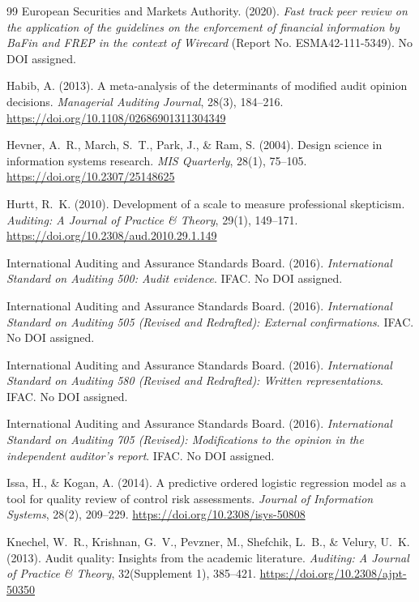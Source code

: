 \documentclass[11pt,a4paper]{article}
\theoremstyle{definition}
\theoremstyle{remark}
\begin{document}
\begin{thebibliography}{99}
European Securities and Markets Authority. (2020).
\emph{Fast track peer review on the application of the guidelines on the enforcement of financial information by BaFin and FREP in the context of Wirecard} (Report No. ESMA42-111-5349). No DOI assigned.

Habib, A. (2013).
A meta-analysis of the determinants of modified audit opinion decisions.
\emph{Managerial Auditing Journal}, 28(3), 184--216. \url{https://doi.org/10.1108/02686901311304349}

Hevner, A.~R., March, S.~T., Park, J., \& Ram, S. (2004).
Design science in information systems research.
\emph{MIS Quarterly}, 28(1), 75--105. \url{https://doi.org/10.2307/25148625}

Hurtt, R.~K. (2010).
Development of a scale to measure professional skepticism.
\emph{Auditing: A Journal of Practice \& Theory}, 29(1), 149--171. \url{https://doi.org/10.2308/aud.2010.29.1.149}

International Auditing and Assurance Standards Board. (2016).
\emph{International Standard on Auditing 500: Audit evidence}. IFAC. No DOI assigned.

International Auditing and Assurance Standards Board. (2016).
\emph{International Standard on Auditing 505 (Revised and Redrafted): External confirmations}. IFAC. No DOI assigned.

International Auditing and Assurance Standards Board. (2016).
\emph{International Standard on Auditing 580 (Revised and Redrafted): Written representations}. IFAC. No DOI assigned.

International Auditing and Assurance Standards Board. (2016).
\emph{International Standard on Auditing 705 (Revised): Modifications to the opinion in the independent auditor's report}. IFAC. No DOI assigned.

Issa, H., \& Kogan, A. (2014).
A predictive ordered logistic regression model as a tool for quality review of control risk assessments.
\emph{Journal of Information Systems}, 28(2), 209--229. \url{https://doi.org/10.2308/isys-50808}

Knechel, W.~R., Krishnan, G.~V., Pevzner, M., Shefchik, L.~B., \& Velury, U.~K. (2013).
Audit quality: Insights from the academic literature.
\emph{Auditing: A Journal of Practice \& Theory}, 32(Supplement 1), 385--421. \url{https://doi.org/10.2308/ajpt-50350}


\end{thebibliography}
\end{document}
